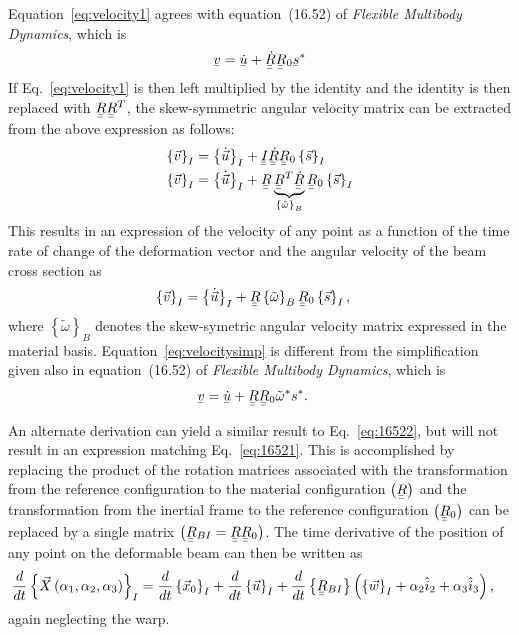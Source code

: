 \documentclass[a4paper]{article}
\newcommand{\ubar}[1]{\underaccent{\bar}{#1}}
\begin{document}
Equation~\eqref{eq:velocity1} agrees with equation~(16.52) of \textit{Flexible Multibody Dynamics}, which is
\begin{align}
  \ubar{v} = \ubar{\dot{u}} + \ubar{\ubar{\dot{R}}} \ubar{\ubar{R}}_{0} \ubar{s}^{*}
  \label{eq:16521}
\end{align}
If Eq.~\eqref{eq:velocity1} is then left multiplied by the identity and the identity is then replaced with $\ubar{\ubar{R}}\ubar{\ubar{R}}^{T}$, the skew-symmetric angular velocity matrix can be extracted from the above expression as follows:
\begin{align}
  \left\{ \vec{v} \right\}_{I} 
  &=  \left\{ \dot{ \vec{u}}\right\}_{I}
  + \ubar{\ubar{I}} \ubar{\ubar{\dot{R}}} \ubar{\ubar{R}}_{0} \left\{ \vec{s} \right\}_{I}  \\
  \left\{ \vec{v} \right\}_{I} 
  &=  \left\{ \dot{ \vec{u}}\right\}_{I} + \ubar{\ubar{R}} 
  \underbrace{\ubar{\ubar{R}}^{T} \ubar{\ubar{\dot{R}}}}_{\left\{ \tilde{\omega} \right\}_{B}} \ubar{\ubar{R}}_{0} \left\{ \vec{s} \right\}_{I}  
\end{align}
This results in an expression of the velocity of any point as a function of the time rate of change of the deformation vector and the angular velocity of the beam cross section as   
\begin{align}
  \left\{ \vec{v} \right\}_{I}
  &= \left\{ \dot{ \vec{u}}\right\}_{I}
  + \ubar{\ubar{R}} \left\{ \tilde{\omega} \right\}_{B} \ubar{\ubar{R}}_{0}  \left\{ \vec{s} \right\}_{I},
  \label{eq:velocitysimp}
\end{align}
where $\left\{ \tilde{\omega} \right\}_{B}$ denotes the skew-symetric angular velocity matrix expressed in the material basis.  Equation~\eqref{eq:velocitysimp} is different from the simplification given also in equation~(16.52) of \textit{Flexible Multibody Dynamics}, which is
\begin{align}
  \ubar{v} &= \ubar{\dot{u}} + \ubar{\ubar{R}} \ubar{\ubar{R}}_{0} \tilde{\omega}^{*}s^{*}.
  \label{eq:16522}
\end{align}

An alternate derivation can yield a similar result to Eq.~\eqref{eq:16522}, but will not result in an expression matching Eq.~\eqref{eq:16521}.  This is accomplished by replacing the product of the rotation matrices associated with the transformation from the reference configuration to the material configuration $\left( \ubar{\ubar{R}} \right)$ and the transformation from the inertial frame to the reference configuration $\left( \ubar{\ubar{R}}_{0} \right)$ can be replaced by a single matrix $\left( \ubar{\ubar{R}}_{BI} = \ubar{\ubar{R}}\ubar{\ubar{R}}_{0} \right)$.  The time derivative of the position of any point on the deformable beam can then be written as
\begin{align}
  \frac{d}{dt}\left\{ \vec{X}\left( \alpha_{1}, \alpha_{2}, \alpha_{3} \right) \right\}_{I}  
  &= \frac{d}{dt} \left\{ \vec{x}_{0} \right\}_{I} 
  + \frac{d}{dt} \left\{ \vec{u} \right\}_{I} 
  + \frac{d}{dt} \left\{ \ubar{\ubar{R}}_{BI} \right\}
  \left( \left\{ \vec{w} \right\}_{I} + \alpha_{2} \hat{i}_{2} + \alpha_{3} \hat{i}_{3} \right), 
  \label{eq:DdefDt2}
\end{align}
again neglecting the warp.  
\end{document}
